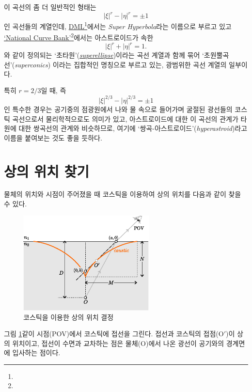 \documentclass[twocolumn]{article}
\begin{document}
이 곡선의 좀 더 일반적인 형태는 
$$ \left| \xi \right|^{r} - \left| \eta \right|^{r} = \pm1 $$
인 곡선들의 계열인데, \href{http://dynamicmathematicslearning.com/super-ellipse.html}%
{DML}\footnote{}에서는 \emph{Super Hyperbola}라는 이름으로 부르고 있고 
\href{https://old.nationalcurvebank.org/superconicncb/superconicncb.htm}{`National Curve Bank'}\footnote{}에서는
아스트로이드가 속한 
$$ \left| \xi \right|^{r} + \left| \eta \right|^{r} = 1. $$
와 같이 정의되는 `초타원'(\href{https://mathworld.wolfram.com/Astroid.html}%
{\emph{superellipse}})이라는 곡선 계열과 함께 묶어
`초원뿔곡선'(\emph{superconics}) 이라는 집합적인 명칭으로 부르고 있는, 광범위한 곡선 계열의 일부이다.

특히 $r = 2/3$일 때, 즉
$$ \left| \xi \right|^{2/3} - \left| \eta \right|^{2/3} = \pm1 $$
인 특수한 경우는 공기중의 점광원에서 나와 물 속으로 들어가며 굴절된 광선들의 코스틱 곡선으로서 
물리학적으로도 의미가 있고, 아스트로이드에 대한 이 곡선의 관계가 타원에 대한 쌍곡선의 관계와 
비슷하므로, 여기에 `쌍곡-아스트로이드'(\emph{hyperastroid})라고 이름을 붙여보는 것도 좋을 듯하다. 

\section{상의 위치 찾기}
물체의 위치와 시점이 주어졌을 때 코스틱을 이용하여 상의 위치를 다음과 같이 찾을 수 있다.

\begin{figure}[!h]
	\centering
	\includegraphics[width=2.7in]{figs/g394.eps}
	\caption{코스틱을 이용한 상의 위치 결정}
	\label{fig:image_caustic}
\end{figure}

그림 \ref{fig:image_caustic}\와 같이 시점(POV)에서 코스틱에 접선을 그린다. 접선과 코스틱의 접점($\mathrm{O'}$)이 상의 위치이고, 접선이 수면과 
교차하는 점은 물체($\mathrm{O}$)에서 나온 광선이 공기와의  경계면에 입사하는 점이다.
\end{document}
